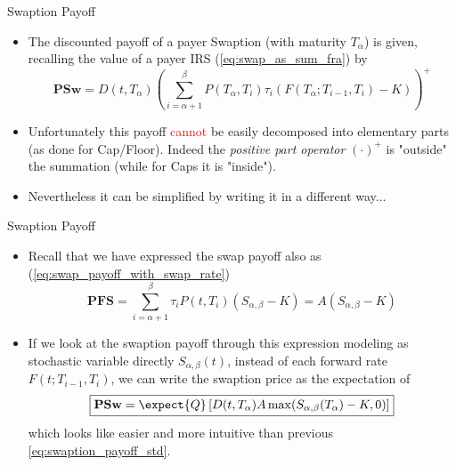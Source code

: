 \documentclass{beamer}
\begin{document}
\begin{frame}{Swaption Payoff}
\begin{itemize}
	\item<1-> The discounted payoff of a payer Swaption (with maturity $T_\alpha$) is given, recalling the value of a payer IRS (\cref{eq:swap_as_sum_fra}) by
	\begin{equation}
		\textbf{PSw}=D(t,T_\alpha)\left(\sum_{i=\alpha+1}^\beta P(T_\alpha,T_i)\tau_i (F(T_\alpha;T_{i-1},T_i) - K)\right)^+
		\label{eq:swaption_payoff_std}
	\end{equation}
	\item<2-> Unfortunately this payoff \textcolor{red}{cannot} be easily decomposed into elementary parts (as done for Cap/Floor). Indeed the \emph{positive part operator} $(\cdot)^+$ is "outside" the summation (while for Caps it is "inside").
	\item<3-> Nevertheless it can be simplified by writing it in a different way...
\end{itemize}
\end{frame}

\begin{frame}{Swaption Payoff}
\begin{itemize}
	\item<1-> Recall that we have expressed the swap payoff also as (\cref{eq:swap_payoff_with_swap_rate})
	\begin{equation*}
	\textbf{PFS}=\sum_{i=\alpha+1}^\beta \tau_i P(t,T_i)(S_{\alpha,\beta}-K) = A(S_{\alpha,\beta}-K)
	\end{equation*}
	\item<2-> If we look at the swaption payoff through this expression modeling as stochastic variable directly $S_{\alpha,\beta}(t)$, instead of each forward rate $F(t;T_{i-1},T_i)$, we can write the swaption price as the expectation of
	\begin{equation}
		\boxed{\textbf{PSw}=\expect{Q}\left[D(t,T_\alpha)A\max(S_{\alpha,\beta}(T_\alpha)-K, 0)\right]}
	\end{equation}
	which looks like easier and more intuitive than previous \cref{eq:swaption_payoff_std}.
\end{itemize}
\end{frame}
\end{document}
